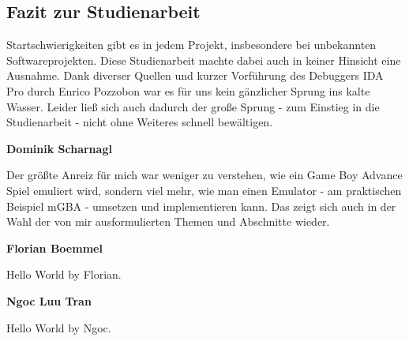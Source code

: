 \documentclass[11pt,a4paper]{scrartcl}
\newcommand{\paratitle}[1] {
    \vspace{5mm}
    \large \textbf{#1} \normalsize
    \vspace{2mm}\newline
}
\begin{document}
\subsection{Fazit zur Studienarbeit}
Startschwierigkeiten gibt es in jedem Projekt, insbesondere bei unbekannten Softwareprojekten. Diese Studienarbeit machte dabei auch in keiner Hinsicht eine Ausnahme. Dank diverser Quellen und kurzer Vorf\"uhrung des Debuggers IDA Pro durch Enrico Pozzobon war es f\"ur uns kein g\"anzlicher Sprung ins kalte Wasser. Leider lie{\ss} sich auch dadurch der gro{\ss}e Sprung - zum Einstieg in die Studienarbeit - nicht ohne Weiteres schnell bew\"altigen.

\paratitle{Dominik Scharnagl}
Der gr\"o{\ss}te Anreiz f\"ur mich war weniger zu verstehen, wie ein Game Boy Advance Spiel emuliert wird, sondern viel mehr, wie man einen Emulator - am praktischen Beispiel mGBA - umsetzen und implementieren kann. Das zeigt sich auch in der Wahl der von mir ausformulierten Themen und Abschnitte wieder.

\paratitle{Florian Boemmel}
Hello World by Florian.

\paratitle{Ngoc Luu Tran}
Hello World by Ngoc.


\newpage
{}
\end{document}
